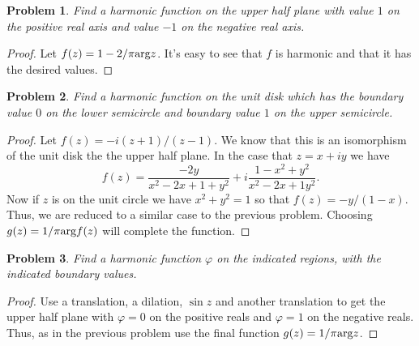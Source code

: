 \documentclass{article}
\newtheorem{problem}{Problem}
\begin{document}
\begin{problem}
Find a harmonic function on the upper half plane with value $1$ on the positive real axis and value $-1$ on the negative real axis.
\end{problem}
\begin{proof}
Let $f(z) = 1 - 2/\pi \textup{arg}z$. It's easy to see that $f$ is harmonic and that it has the desired values.
\end{proof}

\begin{problem}
Find a harmonic function on the unit disk which has the boundary value $0$ on the lower semicircle and boundary value $1$ on the upper semicircle.
\end{problem}
\begin{proof}
Let $f(z) = -i(z+1)/(z-1)$. We know that this is an isomorphism of the unit disk the the upper half plane. In the case that $z = x+iy$ we have
\[
f(z) = \frac{-2y}{x^2 - 2x + 1 + y^2} + i \frac{1 - x^2 + y^2}{x^2 - 2x + 1 y^2}.
\]
Now if $z$ is on the unit circle we have $x^2 + y^2 = 1$ so that $f(z) = -y/(1-x)$. Thus, we are reduced to a similar case to the previous problem. Choosing $g(z) = 1/\pi \textup{arg}f(z)$ will complete the function.
\end{proof}

\begin{problem}
Find a harmonic function $\varphi$ on the indicated regions, with the indicated boundary values.
\end{problem}
\begin{proof}
Use a translation, a dilation, $\sin z$ and another translation to get the upper half plane with $\varphi = 0$ on the positive reals and $\varphi = 1$ on the negative reals. Thus, as in the previous problem use the final function $g(z) = 1/\pi \textup{arg}z$.
\end{proof}
\end{document}
